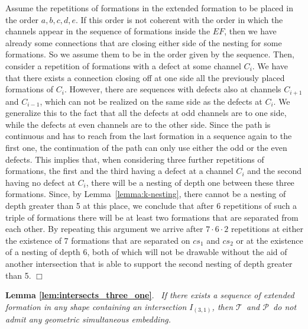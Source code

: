 \documentclass[a4paper,10pt]{llncs}
\renewenvironment{proof}
{{\bf Proof:}}{\hspace*{\fill}$\Box$\par\vspace{2mm}}
\newcommand{\rephrase}[3]{\noindent\textbf{#1 #2}.~\emph{#3}}
\newcommand{\T}{\mbox{$\mathcal T$ }}
\renewcommand{\P}{\mbox{$\mathcal P$ }}
\begin{document}
\begin{proof}
Assume the repetitions of formations in the extended formation to be placed in the order $a,b,c,d,e$.
If this order is not coherent with the order in which the channels appear in the sequence of formations inside the $EF$, then we have already some connections that are closing either side of the nesting for some formations. So we assume them to be in the order given by the sequence. Then, consider a repetition of formations with a defect at some channel $C_i$. We have that there exists a connection closing off at one side all the previously placed formations of $C_i$. However, there are sequences with defects also at channels $C_{i+1}$ and $C_{i-1}$, which can not be realized on the same side as the defects at $C_i$. We generalize this to the fact that all the defects at odd channels are to one side, while the defects at even channels are to the other side.
Since the path is continuous and has to reach from the last formation in a sequence again to the first one, the continuation of the path can only use either the odd or the even defects. This implies that, when considering three further repetitions of formations, the first and the third having a defect at a channel $C_i$ and the second having no defect at $C_i$, there will be a nesting of depth one between these three formations. Since, by Lemma~\ref{lemma:k-nesting}, there cannot be a nesting of depth greater than 5 at this place, we conclude that after 6 repetitions of such a triple of formations there will be at least two formations that are separated from each other. By repeating this argument we arrive after $7\cdot6\cdot2$ repetitions at either the existence of 7 formations that are separated on $cs_1$ and $cs_2$ or at the existence of a nesting of depth 6, both of which will not be drawable without the aid of another intersection that is able to support the second nesting of depth greater than 5.
\end{proof}

\rephrase{Lemma}{\ref{lem:intersects_three_one}}{
If there exists a sequence of extended formation in any shape containing an intersection $I_{(3,1)}$, then \T and \P do not admit any geometric simultaneous embedding.
}
\end{document}
